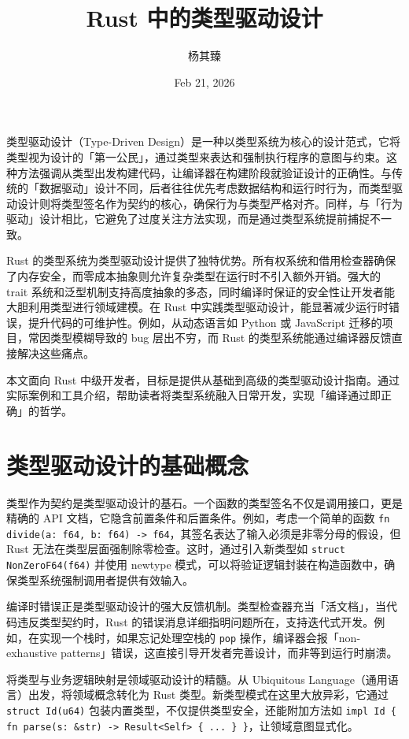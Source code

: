 \title{Rust 中的类型驱动设计}
\author{杨其臻}
\date{Feb 21, 2026}
\maketitle
类型驱动设计（Type-Driven Design）是一种以类型系统为核心的设计范式，它将类型视为设计的「第一公民」，通过类型来表达和强制执行程序的意图与约束。这种方法强调从类型出发构建代码，让编译器在构建阶段就验证设计的正确性。与传统的「数据驱动」设计不同，后者往往优先考虑数据结构和运行时行为，而类型驱动设计则将类型签名作为契约的核心，确保行为与类型严格对齐。同样，与「行为驱动」设计相比，它避免了过度关注方法实现，而是通过类型系统提前捕捉不一致。\par
Rust 的类型系统为类型驱动设计提供了独特优势。所有权系统和借用检查器确保了内存安全，而零成本抽象则允许复杂类型在运行时不引入额外开销。强大的 trait 系统和泛型机制支持高度抽象的多态，同时编译时保证的安全性让开发者能大胆利用类型进行领域建模。在 Rust 中实践类型驱动设计，能显著减少运行时错误，提升代码的可维护性。例如，从动态语言如 Python 或 JavaScript 迁移的项目，常因类型模糊导致的 bug 层出不穷，而 Rust 的类型系统能通过编译器反馈直接解决这些痛点。\par
本文面向 Rust 中级开发者，目标是提供从基础到高级的类型驱动设计指南。通过实际案例和工具介绍，帮助读者将类型系统融入日常开发，实现「编译通过即正确」的哲学。\par
\chapter{类型驱动设计的基础概念}
类型作为契约是类型驱动设计的基石。一个函数的类型签名不仅是调用接口，更是精确的 API 文档，它隐含前置条件和后置条件。例如，考虑一个简单的函数 \texttt{fn divide(a: f64, b: f64) -> f64}，其签名表达了输入必须是非零分母的假设，但 Rust 无法在类型层面强制除零检查。这时，通过引入新类型如 \texttt{struct NonZeroF64(f64)} 并使用 newtype 模式，可以将验证逻辑封装在构造函数中，确保类型系统强制调用者提供有效输入。\par
编译时错误正是类型驱动设计的强大反馈机制。类型检查器充当「活文档」，当代码违反类型契约时，Rust 的错误消息详细指明问题所在，支持迭代式开发。例如，在实现一个栈时，如果忘记处理空栈的 \texttt{pop} 操作，编译器会报「non-exhaustive patterns」错误，这直接引导开发者完善设计，而非等到运行时崩溃。\par
将类型与业务逻辑映射是领域驱动设计的精髓。从 Ubiquitous Language（通用语言）出发，将领域概念转化为 Rust 类型。新类型模式在这里大放异彩，它通过 \texttt{struct Id(u64)} 包装内置类型，不仅提供类型安全，还能附加方法如 \texttt{impl Id \{{} fn parse(s: \&{}str) -> Result<Self> \{{} ... \}{} \}{}}，让领域意图显式化。\par
